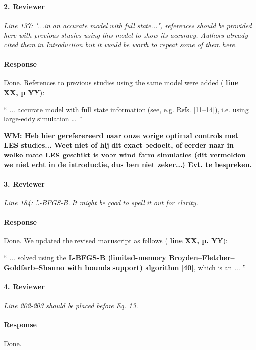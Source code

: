 \documentclass[]{article}
\newcommand{\red}[1]{\textbf{\color{red} #1}}
\newcommand{\revision}[1]{\textbf{#1}}
\begin{document}
\hrulefill

\paragraph{2. Reviewer} \textit{Line 137: "...in an accurate model with full state...", references should be provided here with previous studies using this model to show its accuracy. Authors already cited them in Introduction but it would be worth to repeat some of them here.}

\paragraph{Response} Done. References to previous studies using the same model were added (\red{line XX, p YY}):

``
... accurate model with full state information (see, e.g. Refs. [11--14]), i.e. using large-eddy simulation ...
''

\red{WM: Heb hier gereferereerd naar onze vorige optimal controls met LES studies... Weet niet of hij dit exact bedoelt, of eerder naar in welke mate LES geschikt is voor wind-farm simulaties (dit vermelden we niet echt in de introductie, dus ben niet zeker...) Evt. te bespreken. }

\hrulefill

\paragraph{3. Reviewer} \textit{Line 184: L-BFGS-B. It might be good to spell it out for clarity.}

\paragraph{Response} Done. We updated the revised manuscript as follows (\red{line XX, p. YY}):

`` 
$\dots$ solved using the \revision{L-BFGS-B (limited-memory Broyden--Fletcher--Goldfarb--Shanno with bounds support) algorithm [40]}, which is an $\dots$
''

\hrulefill

\paragraph{4. Reviewer} \textit{Line 202-203 should be placed before Eq. 13.}

\paragraph{Response} Done.
\end{document}
